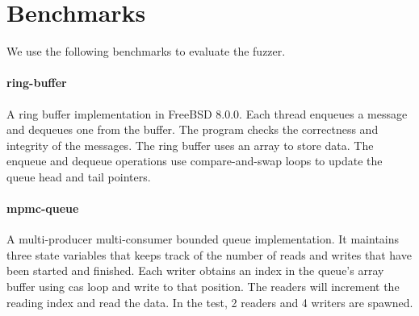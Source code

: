
\section{Benchmarks}

We use the following benchmarks to evaluate the fuzzer.


\paragraph{ring-buffer} A ring buffer implementation in FreeBSD 8.0.0. Each thread enqueues a message and dequeues one from the buffer. The program checks the correctness and integrity of the messages. The ring buffer uses an array to store data. The enqueue and dequeue operations use compare-and-swap loops to update the queue head and tail pointers.


\paragraph{mpmc-queue} A multi-producer multi-consumer bounded queue implementation. It maintains three state variables that keeps track of the number of reads and writes that have been started and finished. Each writer obtains an index in the queue's array buffer using cas loop and write to that position. The readers will increment the reading index and read the data. In the test, 2 readers and 4 writers are spawned.



